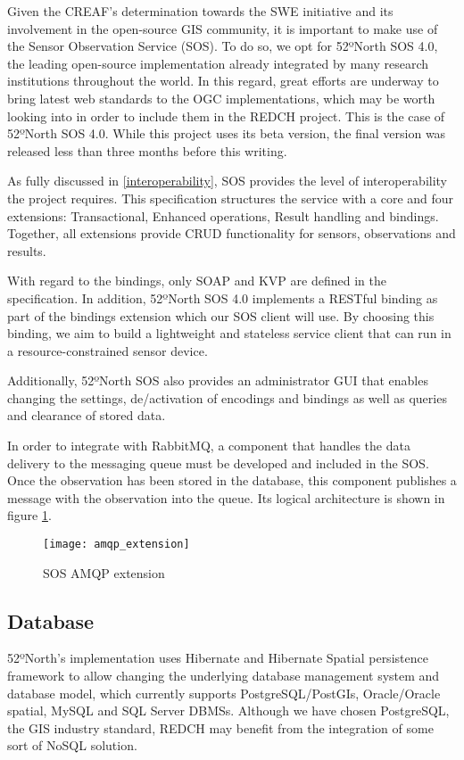 Given the CREAF's determination towards the SWE initiative and its involvement in  the open-source GIS community, it is important to make use of the Sensor Observation Service (SOS). To do so, we opt for 52ºNorth SOS 4.0, the leading open-source implementation already integrated by many research institutions throughout the world. In this regard, great efforts are underway to bring latest web standards to the OGC implementations, which may be worth looking into in order to include them in the REDCH project. This is the case of 52ºNorth SOS 4.0. While this project uses its beta version, the final version was released less than three months before this writing.

As fully discussed in \ref{interoperability}, SOS provides the level of interoperability the project requires. This specification structures the service with a core and four extensions: Transactional, Enhanced operations, Result handling and bindings. Together, all extensions provide CRUD functionality for sensors, observations and results.

With regard to the bindings, only SOAP and KVP are defined in the specification. In addition, 52ºNorth SOS 4.0 implements a RESTful binding as part of the bindings extension which our SOS client will use. By choosing this binding, we aim to build a lightweight and stateless service client that can run in a resource-constrained sensor device.

Additionally, 52ºNorth SOS also provides an administrator GUI that enables changing the settings, de/activation of encodings and bindings as well as queries and clearance of stored data.

In order to integrate with RabbitMQ, a component that handles the data delivery to the messaging queue must be developed and included in the SOS. Once the observation has been stored in the database, this component publishes a message with the observation into the queue. Its logical architecture is shown in figure \ref{fig:amqp_extension}.

\begin{figure}[p]
	\centering
	\texttt{[image: amqp\_extension]}
	\caption{SOS AMQP extension}
	\label{fig:amqp_extension}
\end{figure}

\subsection{Database}

52ºNorth's implementation uses Hibernate and Hibernate Spatial persistence framework to allow changing the underlying database management system and database model, which currently supports PostgreSQL/PostGIs, Oracle/Oracle spatial, MySQL and SQL Server DBMSs. Although we have chosen PostgreSQL, the GIS industry standard, REDCH may benefit from the integration of some sort of NoSQL solution.

